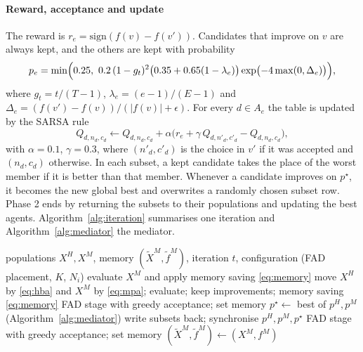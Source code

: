 \documentclass[11pt]{article}
\theoremstyle{definition}
\theoremstyle{remark}
\begin{document}
\paragraph{Reward, acceptance and update} The reward is $r_e=\mathrm{sign}(f(v)-f(v'))$. Candidates that improve on
$v$ are always kept, and the others are kept with probability
\begin{equation}
p_e = \min\Bigl(0.25,\ 0.2\,(1-g_t)^2\bigl(0.35+0.65(1-\lambda_e)\bigr)\exp\bigl(-4\max(0,\Delta_e)\bigr)\Bigr),
\label{eq:accept}
\end{equation}
where $g_t=t/(T-1)$, $\lambda_e=(e-1)/(E-1)$ and $\Delta_e=(f(v')-f(v))/(|f(v)|+\epsilon)$. For every $d\in A_e$ the
table is updated by the SARSA rule
\begin{equation}
Q_{d,n_d,c_d} \leftarrow Q_{d,n_d,c_d} + \alpha\bigl(r_e + \gamma\,Q_{d,n'_d,c'_d} - Q_{d,n_d,c_d}\bigr),
\label{eq:sarsa}
\end{equation}
with $\alpha=0.1$, $\gamma=0.3$, where $(n'_d,c'_d)$ is the choice in $v'$ if it was accepted and $(n_d,c_d)$ otherwise.
In each subset, a kept candidate takes the place of the worst member if it is better than that member. Whenever a
candidate improves on $p^\star$, it becomes the new global best and overwrites a randomly chosen subset row. Phase 2 ends
by returning the subsets to their populations and updating the best agents. Algorithm~\ref{alg:iteration} summarises one iteration and Algorithm~\ref{alg:mediator} the
mediator.

\begin{algorithm}[t]
\caption{One iteration of MPHBS and of the study's arms. Lines marked with an arm apply only to that arm.}
\label{alg:iteration}
\small
\begin{algorithmic}[1]
\Require populations $X^H,X^M$, memory $(\tilde X^M,\tilde f^M)$, iteration $t$, configuration (FAD placement, $K$, $N_i$)
 evaluate $X^M$ and apply memory saving \eqref{eq:memory} \EndIf
\State move $X^H$ by \eqref{eq:hba} and $X^M$ by \eqref{eq:mpa}; evaluate; keep improvements; memory saving
\eqref{eq:memory} 
 FAD stage with greedy acceptance; set memory \EndIf
\State $p^\star\gets$ best of $p^H,p^M$
  (Algorithm~\ref{alg:mediator}) \EndIf
\State write subsets back; synchronise $p^H,p^M,p^\star$
 FAD stage with greedy acceptance; set memory \EndIf
{} $(\tilde X^M,\tilde f^M)\gets(X^M,f^M)$ \EndIf
\end{algorithmic}
\end{algorithm}
\end{document}
